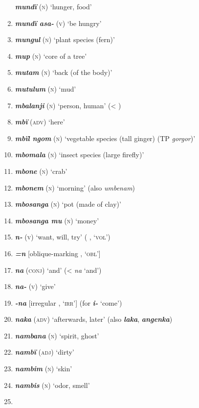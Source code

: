 \begin{enumerate}[noitemsep, label={}, align=left, widest=190, labelsep=1ex,leftmargin=*,itemindent=-10pt]
\textbf{\textit{mundï} }(\textsc{n}) ‘hunger, food’ \item
\textbf{\textit{mundï asa-}} (\textsc{v}) ‘be hungry’ \item
\textbf{\textit{mungul}} (\textsc{n}) ‘plant species (fern)’ \item
\textbf{\textit{mup}} (\textsc{n}) ‘core of a tree’ \item
\textbf{\textit{mutam}} (\textsc{n}) ‘back (of the body)’ \item
\textbf{\textit{mutulum}} (\textsc{n}) ‘mud’ \item
\textbf{\textit{mbalanji}} (\textsc{n}) ‘person, human’ (< ) \item
\textbf{\textit{mbï}} (\textsc{adv}) ‘here’ \item
\textbf{\textit{mbïl ngom}} (\textsc{n}) ‘vegetable species (tall ginger) (TP \textit{gorgor})’ \item
\textbf{\textit{mbomala}} (\textsc{n}) ‘insect species (large firefly)’ \item
\textbf{\textit{mbone}} (\textsc{n}) ‘crab’ \item
\textbf{\textit{mbonem}} (\textsc{n}) ‘morning’ (also \textit{umbenam}) \item
\textbf{\textit{mbosanga}} (\textsc{n}) ‘pot (made of clay)’ \item
\textbf{\textit{mbosanga mu}} (\textsc{n}) ‘money’ \item
\textbf{\textit{n-}} (\textsc{v}) ‘want, will, try’ ( , ‘\textsc{vol}’) \item
\textbf{\textit{=n}}  [oblique-marking , ‘\textsc{obl}’] \item
\textbf{\textit{na}} (\textsc{conj}) ‘and’ (<  \textit{na} ‘and’) \item
\textbf{\textit{na-}} (\textsc{v}) ‘give’ \item
\textbf{\textit{-na}} [irregular  , ‘\textsc{irr}’] (for \textbf{\textit{i-}} ‘come’) \item
\textbf{\textit{naka}} (\textsc{adv}) ‘afterwards, later’ (also \textbf{\textit{laka}}, \textbf{\textit{angenka}}) \item
\textbf{\textit{nambana}} (\textsc{n}) ‘spirit, ghost’ \item
\textbf{\textit{nambï}} (\textsc{adj}) ‘dirty’ \item
\textbf{\textit{nambim}} (\textsc{n}) ‘skin’ \item
\textbf{\textit{nambis}} (\textsc{n}) ‘odor, smell’ \item

\end{enumerate}
